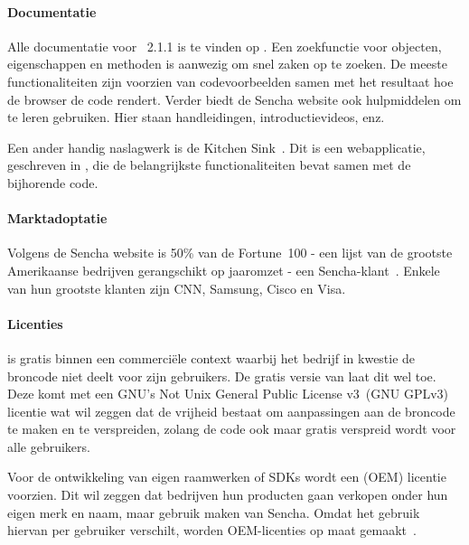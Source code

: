 \paragraph{Documentatie}
Alle documentatie voor \st{}~2.1.1 is te vinden op .  
Een zoekfunctie voor objecten,  eigenschappen en methoden is aanwezig om snel zaken op te zoeken.  
De meeste functionaliteiten zijn voorzien van codevoorbeelden samen met het resultaat hoe de browser de code rendert.  
Verder biedt de Sencha website ook hulpmiddelen om \st{} te leren gebruiken.  
Hier staan handleidingen, introductievideos, enz.

Een ander handig naslagwerk is de Kitchen Sink~\cite{Inc.2013}.  
Dit is een webapplicatie,  geschreven in \st{},  die de belangrijkste functionaliteiten bevat samen met de bijhorende code.  

\paragraph{Marktadoptatie}
Volgens de Sencha website is 50\% van de Fortune~100 - een lijst van de grootste Amerikaanse bedrijven gerangschikt op jaaromzet - een Sencha-klant~\cite{Inc.}.  
Enkele van hun grootste klanten zijn CNN,  Samsung,  Cisco en  Visa.

\paragraph{Licenties}
\st{} is gratis binnen een commerciële context waarbij het bedrijf in kwestie de broncode niet deelt voor zijn gebruikers.  
De gratis  versie van \st{} laat dit wel toe.  
Deze komt met een GNU's Not Unix General Public License v3~(GNU GPLv3)  licentie wat wil zeggen dat de vrijheid bestaat om aanpassingen aan de broncode te maken en te verspreiden,  zolang de code ook maar gratis verspreid wordt voor alle gebruikers.
  
Voor de ontwikkeling van eigen raamwerken of SDKs wordt een  (OEM) licentie voorzien.  
Dit wil zeggen dat bedrijven hun producten gaan verkopen onder hun eigen merk en naam, maar gebruik maken van Sencha.  
Omdat het gebruik hiervan per gebruiker verschilt,  worden OEM-licenties op maat gemaakt~\cite{Inc.}.

